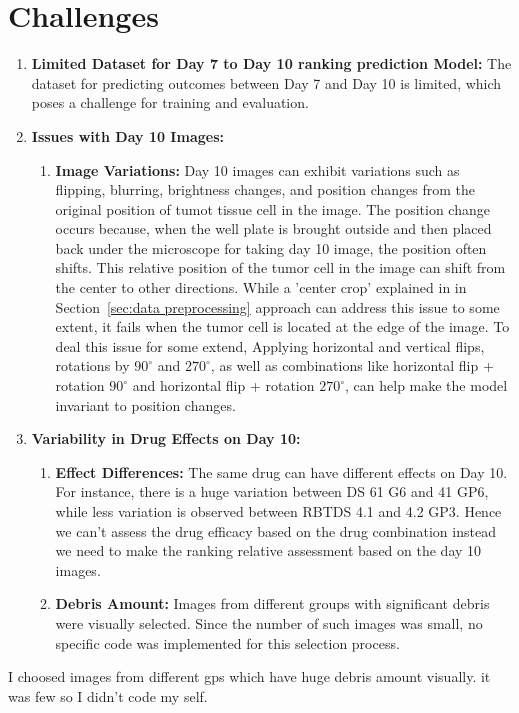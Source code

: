 \section{Challenges}
\begin{enumerate}
    \item \textbf{Limited Dataset for Day 7 to Day 10 ranking prediction Model:} The dataset for predicting outcomes between Day 7 and Day 10 is limited, which poses a challenge for training and evaluation.

    \item \textbf{Issues with Day 10 Images:}
    \begin{enumerate}
        \item \textbf{Image Variations:} Day 10 images can exhibit variations such as flipping, blurring, brightness changes, and position changes from the original position of tumot tissue 
        cell in the image. 
        The position change occurs because, when the well plate is brought outside and then placed back under the microscope for taking day 10 image, 
        the position often shifts. This relative position of the tumor cell in the image can shift from the center to other directions.
         While a 'center crop' explained in in Section~\ref{sec:data preprocessing} approach can address this issue to some extent, it fails when the tumor cell 
         is located at the edge of the image. To deal this issue for some extend, Applying horizontal and vertical flips, rotations by $90^\circ$ and $270^\circ$, as 
        well as combinations like horizontal flip + rotation $90^\circ$ and horizontal flip + rotation $270^\circ$, can help make the model invariant to position changes.
    \end{enumerate}

    \item \textbf{Variability in Drug Effects on Day 10:}
    \begin{enumerate}
        \item \textbf{Effect Differences:} The same drug can have different effects on Day 10. For instance, there is a huge variation between DS 61 G6 and 
        41 GP6, while less variation is observed between RBTDS 4.1 and 4.2 GP3. Hence we can't assess the drug efficacy based on the drug combination instead we need to make the ranking relative 
        assessment based on the day 10 images.
        \item \textbf{Debris Amount:} Images from different groups with significant debris were visually selected. Since the number of such images was small, no specific code was implemented for this selection process.
    \end{enumerate}
\end{enumerate}


 










I choosed images from different gps which have huge debris amount visually. it was few so I didn't code my self.
